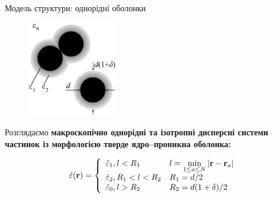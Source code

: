 \documentclass[10pt]{beamer}
\begin{document}
\begin{frame}{Модель структури: однорідні оболонки}

\begin{figure}
\vspace{-25pt}
  \begin{center}
    \includegraphics[width=0.35\textwidth]{images/particles-pen.eps}
  \end{center}
\vspace{-25pt}
\end{figure}


\footnotesize
Розглядаємо \textbf{макроскопічно однорідні та ізотропні дисперсні системи частинок із морфологією тверде ядро--проникна оболонка:}
\vspace{-10pt}

$$
    \hat{\varepsilon}({\bf r}) = \left\{ 
    \begin{array}{ll}
    \hat{\varepsilon}_1, l<R_1 & l = \min\limits_{1 \leq a \leq N} |{\bf r} - {\bf r}_a| \\
    \hat{\varepsilon}_2, R_1 < l < R_2 & R_1 = d/2 \\
    \hat{\varepsilon}_0, l > R_2 & R_2 = d(1+\delta)/2
    \end{array}    
    \right. 
$$


\end{frame}
\end{document}
